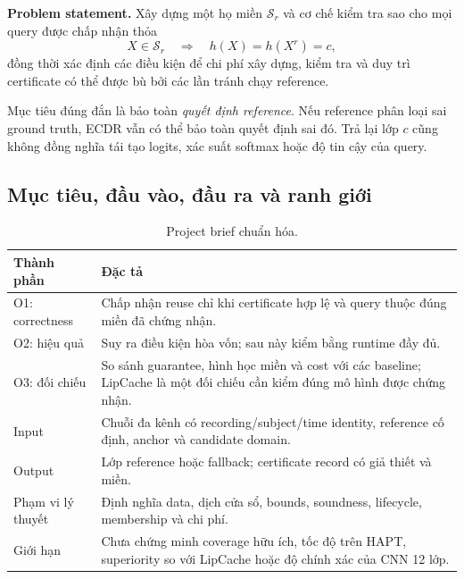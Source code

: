 \documentclass[11pt,a4paper]{article}
\newcommand{\Sset}{\mathcal S}
\theoremstyle{remark}
\begin{document}
\textbf{Problem statement.} Xây dựng một họ miền $\Sset_r$ và cơ chế kiểm tra
sao cho mọi query được chấp nhận thỏa
\begin{equation}
 X\in\Sset_r\quad\Longrightarrow\quad h(X)=h(X^r)=c,
 \label{eq:target}
\end{equation}
đồng thời xác định các điều kiện để chi phí xây dựng, kiểm tra và duy trì
certificate có thể được bù bởi các lần tránh chạy reference.

Mục tiêu đúng đắn là bảo toàn \emph{quyết định reference}. Nếu reference
phân loại sai ground truth, ECDR vẫn có thể bảo toàn quyết định sai đó. Trả
lại lớp $c$ cũng không đồng nghĩa tái tạo logits, xác suất softmax hoặc độ
tin cậy của query.

\subsection{Mục tiêu, đầu vào, đầu ra và ranh giới}
\begin{table}[htbp]\centering
\caption{Project brief chuẩn hóa.}
\begin{tabularx}{\linewidth}{@{}p{2.5cm}Y@{}}\toprule
Thành phần & Đặc tả\\\midrule
O1: correctness & Chấp nhận reuse chỉ khi certificate hợp lệ và query thuộc
đúng miền đã chứng nhận.\\
O2: hiệu quả & Suy ra điều kiện hòa vốn; sau này kiểm bằng runtime đầy đủ.\\
O3: đối chiếu & So sánh guarantee, hình học miền và cost với các baseline;
LipCache là một đối chiếu cần kiểm đúng mô hình được chứng nhận.\\
Input & Chuỗi đa kênh có recording/subject/time identity, reference cố định,
anchor và candidate domain.\\
Output & Lớp reference hoặc fallback; certificate record có giả thiết và miền.\\
Phạm vi lý thuyết & Định nghĩa data, dịch cửa sổ, bounds, soundness, lifecycle,
membership và chi phí.\\
Giới hạn & Chưa chứng minh coverage hữu ích, tốc độ trên HAPT, superiority
so với LipCache hoặc độ chính xác của CNN 12 lớp.\\\bottomrule
\end{tabularx}
\end{table}
\end{document}
